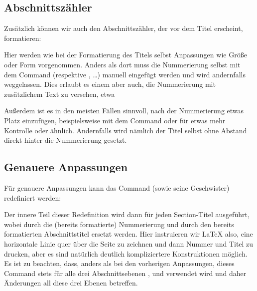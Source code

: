 \subsection{Abschnittszähler}
Zusätzlich können wir auch den Abschnittszähler, der vor dem Titel erscheint, formatieren:
\begin{latexlisting}
\renewcommand*{\sectionformat}{\Large\scshape\thesection\qquad}	
\end{latexlisting}
Hier werden wie bei der Formatierung des Titels selbst Anpassungen wie Größe oder Form vorgenommen.
Anders als dort muss die Nummerierung selbst mit dem Command  (respektive \latexcommand{\thechapter}, \dots) manuell eingefügt werden und wird andernfalls weggelassen.
Dies erlaubt es einem aber auch, die Nummerierung mit zusätzlichem Text zu versehen, etwa
\begin{latexlisting}
\renewcommand*{\sectionformat}{\Large\scshape\thesection . Abschnitt\qquad}	
\end{latexlisting}
Außerdem ist es in den meisten Fällen sinnvoll, nach der Nummerierung etwas Platz einzufügen, beispielsweise mit dem Command  oder für etwas mehr Kontrolle  oder ähnlich.
Andernfalls wird nämlich der Titel selbst ohne Abstand direkt hinter die Nummerierung gesetzt.

\subsection{Genauere Anpassungen}
Für genauere Anpassungen kann das Command  (sowie seine Geschwister) redefiniert werden:
\begin{latexlisting}
	\renewcommand{\sectionlinesformat}[4]{%
	  \rule[-.15\baselineskip]{\linewidth}{.5pt}\par\nobreak%
	  #3%
	  #4%
	}
\end{latexlisting}
Der innere Teil dieser Redefinition wird dann für jeden Section-Titel ausgeführt, wobei  durch die (bereits formatierte) Nummerierung und  durch den bereits formatierten Abschnittstitel ersetzt werden.
Hier instruieren wir \LaTeX{} also, eine horizontale Linie quer über die Seite zu zeichnen und dann Nummer und Titel zu drucken, aber es sind natürlich deutlich kompliziertere Konstruktionen möglich.
Es ist zu beachten, dass, anders als bei den vorherigen Anpassungen, dieses Command stets für alle drei Abschnittsebenen ,  und  verwendet wird und daher Änderungen all diese drei Ebenen betreffen.

